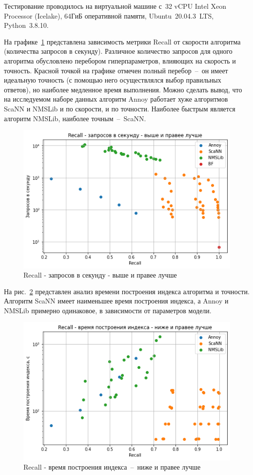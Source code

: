 \documentclass[a4paper,14pt]{article}
\begin{document}
    Тестирование проводилось на виртуальной машине с~32 vCPU Intel Xeon Processor (Icelake), 64ГиБ оперативной памяти, Ubuntu~20.04.3~LTS, Python~3.8.10.

    На графике~\ref{fig:ann_recall_qps} представлена зависимость метрики Recall от скорости алгоритма (количества запросов в секунду).
    Различное количество запросов для одного алгоритма обусловлено перебором гиперпараметров, влияющих на скорость и точность.
    Красной точкой на графике отмечен полный перебор~--~он имеет идеальную точность (с помощью него осуществлялся выбор правильных ответов), но наиболее медленное время выполнения.
    Можно сделать вывод, что на исследуемом наборе данных алгоритм Annoy работает хуже алгоритмов ScaNN и NMSLib и по скорости, и по точности.
    Наиболее быстрым является алгоритм NMSLib, наиболее точным~--~ScaNN.

    \begin{figure}[H]
        \centering
        \includegraphics[width=0.7\linewidth]{images/ann_recall_qps}
        \caption{Recall - запросов в секунду - выше и правее лучше}
        \label{fig:ann_recall_qps}
    \end{figure}

    На рис.~\ref{fig:ann_recall_build} представлен анализ времени построения индекса алгоритма и точности.
    Алгоритм ScaNN имеет наименьшее время построения индекса, а Annoy и NMSLib примерно одинаковое, в зависимости от параметров модели.

    \begin{figure}[H]
        \centering
        \includegraphics[width=0.7\linewidth]{images/ann_recall_build}
        \caption{Recall - время построения индекса~--~ниже и правее лучше}
        \label{fig:ann_recall_build}
    \end{figure}
\end{document}
